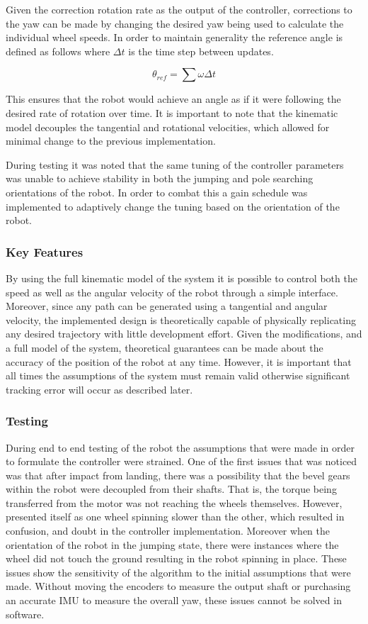 \documentclass[ece]{uw-wkrpt}
\begin{document}
Given the correction rotation rate as the output of the controller, corrections to the yaw can be made by changing the desired yaw being used to calculate the individual wheel speeds. In order to maintain generality the reference angle is defined as follows where $\Delta t$ is the time step between updates. 

\[\theta_{ref} = \sum\omega \Delta t\]

This ensures that the robot would achieve an angle as if it were following the desired rate of rotation over time. It is important to note that the kinematic model decouples the tangential and rotational velocities, which allowed for minimal change to the previous implementation. 

During testing it was noted that the same tuning of the controller parameters was unable to achieve stability in both the jumping and pole searching orientations of the robot. In order to combat this a gain schedule was implemented to adaptively change the tuning based on the orientation of the robot. 

\subsubsection{Key Features}

By using the full kinematic model of the system it is possible to control both the speed as well as the angular velocity of the robot through a simple interface. Moreover, since any path can be generated using a tangential and angular velocity, the implemented design is theoretically capable of physically replicating any desired trajectory with little development effort. Given the modifications, and a full model of the system, theoretical guarantees can be made about the accuracy of the position of the robot at any time. However, it is important that all times the assumptions of the system must remain valid otherwise significant tracking error will occur as described later.

\subsubsection{Testing}

During end to end testing of the robot the assumptions that were made in order to formulate the controller were strained. One of the first issues that was noticed was that after impact from landing, there was a possibility that the bevel gears within the robot were decoupled from their shafts. That is, the torque being transferred from the motor was not reaching the wheels themselves. However, presented itself as one wheel spinning slower than the other, which resulted in confusion, and doubt in the controller implementation. Moreover when the orientation of the robot in the jumping state, there were instances where the wheel did not touch the ground resulting in the robot spinning in place. These issues show the sensitivity of the algorithm to the initial assumptions that were made. Without moving the encoders to measure the output shaft or purchasing an accurate IMU to measure the overall yaw, these issues cannot be solved in software. 
\end{document}
